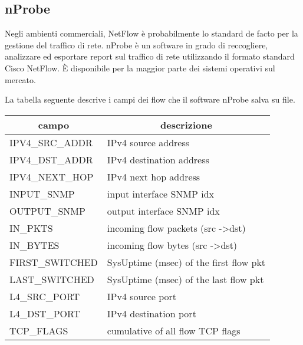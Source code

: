 \documentclass[../main.tex]{subfiles}
\begin{document}
\subsection{nProbe}

Negli ambienti commerciali, NetFlow è probabilmente lo standard de facto per la gestione del traffico di rete. nProbe è un software in grado di reccogliere, analizzare ed esportare report sul traffico di rete utilizzando il formato standard Cisco NetFlow. È disponibile per la maggior parte dei sistemi operativi sul mercato. \newline

La tabella seguente descrive i campi dei flow che il software nProbe salva su file.

\begin{table}[H]
\begin{tabular}{|l|l|}
\hline
\multicolumn{1}{|c|}{\textbf{campo}} & \multicolumn{1}{c|}{\textbf{descrizione}}     \\ \hline
IPV4\_SRC\_ADDR                      & IPv4 source address                           \\ \hline
IPV4\_DST\_ADDR                      & IPv4 destination address                      \\ \hline
IPV4\_NEXT\_HOP                      & IPv4 next hop address                         \\ \hline
INPUT\_SNMP                          & input interface SNMP idx                      \\ \hline
OUTPUT\_SNMP                         & output interface SNMP idx                     \\ \hline
IN\_PKTS                             & incoming flow packets (src -\textgreater dst) \\ \hline
IN\_BYTES                            & incoming flow bytes (src -\textgreater dst)   \\ \hline
FIRST\_SWITCHED                      & SysUptime (msec) of the first flow pkt        \\ \hline
LAST\_SWITCHED                       & SysUptime (msec) of the last flow pkt         \\ \hline
L4\_SRC\_PORT                        & IPv4 source port                              \\ \hline
L4\_DST\_PORT                        & IPv4 destination port                         \\ \hline
TCP\_FLAGS                           & cumulative of all flow TCP flags              \\ \hline

\end{tabular}
\end{table}
\end{document}
